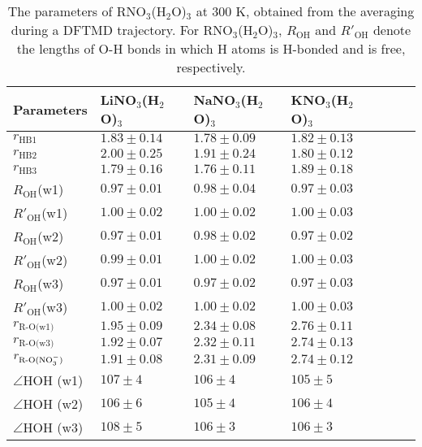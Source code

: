 %
\begin{table}[H] %
\centering
\caption{\label{tab:table_rnitrate_3w}%
The parameters of RNO$_3$(H$_2$O)$_3$ at 300 K, obtained from the averaging during a DFTMD trajectory. 
  For RNO$_3$(H$_2$O)$_3$, $R_\text{OH}$ and $R'_\text{OH}$ 
  denote the lengths of O-H bonds in which H atoms is H-bonded and is free, respectively.
  }
\begin{tabular}{l*{4}lll}
Parameters & LiNO$_3$(H$_2$O)$_3$& NaNO$_3$(H$_2$O)$_3$ & KNO$_3$(H$_2$O)$_3$\\
\hline
$r_\text{HB1}$ & $1.83\pm0.14$ & $1.78\pm0.09$ & $1.82\pm0.13$\\
$r_\text{HB2}$ & $2.00\pm0.25$ & $1.91\pm0.24$ & $1.80\pm0.12$\\
$r_\text{HB3}$ &$1.79\pm0.16$ & $1.76\pm0.11$ & $1.89\pm0.18$\\
$R_\text{OH}$(w1) &$0.97\pm0.01$ &$0.98\pm0.04$ &$0.97\pm0.03$ \\
$R'_\text{OH}$(w1) &$1.00\pm0.02$ &$1.00\pm0.02$ & $1.00\pm0.03$ \\
$R_\text{OH} $(w2) &$0.97\pm0.01$ &$0.98\pm0.02$ &$0.97\pm0.02$ \\ 
$R'_\text{OH}$(w2) &$0.99\pm0.01$ &$1.00\pm0.02$ & $1.00\pm0.03$ \\
$R_\text{OH}$(w3) &$0.97\pm0.01$ & $0.97\pm0.02$&$0.97\pm0.03$ \\
$R'_\text{OH}$(w3) &$1.00\pm0.02$ &$1.00\pm0.02$ & $1.00\pm0.03$ \\
$r_\text{R-O(w1)}$ & $1.95\pm0.09$ & $2.34\pm0.08$ & $2.76\pm0.11$\\
$r_\text{R-O(w3)}$ & $1.92\pm0.07$ & $2.32\pm0.11$ & $2.74\pm0.13$\\
$r_\text{R-O(NO$_3^-$)}$ & $1.91\pm0.08$ & $2.31\pm0.09$ & $2.74\pm0.12$ \\
$\angle$HOH (w1) &$107\pm4$ & $106\pm4$ &$105\pm5$ \\
$\angle$HOH (w2) &$106\pm6$ & $105\pm4$ &$106\pm4$ \\
$\angle$HOH (w3) &$108\pm5$ & $106\pm3$ &$106\pm3$ 
\end{tabular}
\end{table}
